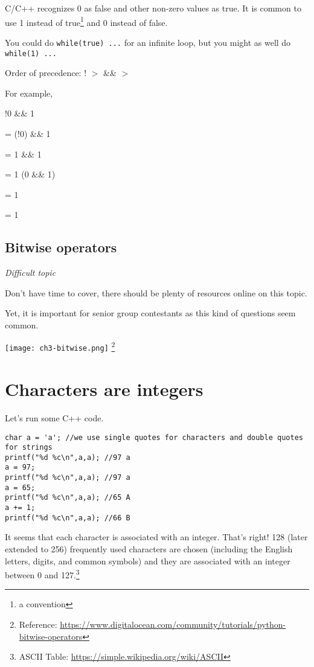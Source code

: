C/C++ recognizes 0 as false and other non-zero values as true. It is common to use 1 instead of true\footnote{a convention} and 0 instead of false.

You could do \texttt{while(true) ...} for an infinite loop, but you might as well do \texttt{while(1) ...}
\vspace{6mm}

Order of precedence: ! $>$ \&\& $>$ \textbar\textbar

For example, 

!0 \textbar{} \&\& 1

= (!0) \textbar{} \&\& 1

= 1 \textbar{} \&\& 1

= 1 \textbar\textbar (0 \&\& 1)

= 1 \textbar{}

= 1

\subsection{Bitwise operators}

\textit{Difficult topic}
\vspace{6mm}

Don't have time to cover, there should be plenty of resources online on this topic. 

Yet, it is important for senior group contestants as this kind of questions seem common. 

\texttt{[image: ch3-bitwise.png]}
\footnote{Reference: \href{https://www.digitalocean.com/community/tutorials/python-bitwise-operators}{https://www.digitalocean.com/community/tutorials/python-bitwise-operators}}

\section{Characters are integers}

Let's run some C++ code.

\begin{lstlisting}
char a = 'a'; //we use single quotes for characters and double quotes for strings
printf("%d %c\n",a,a); //97 a
a = 97;
printf("%d %c\n",a,a); //97 a
a = 65;
printf("%d %c\n",a,a); //65 A
a += 1;
printf("%d %c\n",a,a); //66 B
\end{lstlisting}

It seems that each character is associated with an integer. That's right! 128 (later extended to 256) frequently used characters are chosen (including the English letters, digits, and common symbols) and they are associated with an integer between 0 and 127.\footnote{ASCII Table: \href{https://simple.wikipedia.org/wiki/ASCII}{https://simple.wikipedia.org/wiki/ASCII}}

